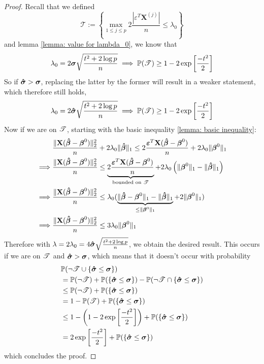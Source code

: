 \begin{proof}
    Recall that we defined
    \[
        \mathscr{T} := \left\{ \max _{1 \leq j \leq p} 2 \frac{\left| \varepsilon^{T} \mathbf{X}^{(j)}\right|}{n} \leq \lambda_{0}\right\}
    \]
    and lemma \ref{lemma: value for lambda_0}, we know that
    \[
        \lambda_{0} = 2 \boldsymbol{\sigma} \sqrt{\frac{t^{2}+2 \log p}{n}} \implies \mathbb{P}(\mathscr{T}) \geq 1-2 \exp \left[ \frac{-t^{2}}{2} \right]
    \]
    So if \(\boldsymbol{\hat{\sigma}} > \boldsymbol{\sigma}\), replacing the latter by the former will result in a weaker statement, which therefore still holds, \ie
    \[
        \lambda_{0} = 2 \boldsymbol{\hat{\sigma}} \sqrt{\frac{t^{2}+2 \log p}{n}} \implies \mathbb{P}(\mathscr{T}) \geq 1-2 \exp \left[ \frac{-t^{2}}{2} \right]
    \]
    Now if we are on \(\mathscr{T}\), starting with the basic inequality \ref{lemma: basic inequality}:
    \begin{align*}
                 & \frac{\| \mathbf{X} (\boldsymbol{\hat{\beta}}-\boldsymbol{\beta}^{0})\|_{2}^{2}}{n} + 2\lambda_0 \|\boldsymbol{\hat{\beta}}\|_{1} \leq 2 \frac{\boldsymbol{\varepsilon}^{T} \mathbf{X} (\boldsymbol{\hat{\beta}}-\boldsymbol{\beta}^{0})}{n} + 2\lambda_0 \| \boldsymbol{\beta}^{0} \|_{1}                                             \\
        \implies & \frac{\| \mathbf{X} (\boldsymbol{\hat{\beta}}-\boldsymbol{\beta}^{0})\|_{2}^{2}}{n} \leq \underbrace{2 \frac{\boldsymbol{\varepsilon}^{T} \mathbf{X} (\boldsymbol{\hat{\beta}} - \boldsymbol{\beta}^{0})}{n}}_{\text{bounded on } \mathscr{T}} + 2 \lambda_0 \left( \| \boldsymbol{\beta}^{0} \|_{1} - \|\boldsymbol{\hat{\beta}}\|_{1} \right) \\
        \implies & \frac{\| \mathbf{X} (\boldsymbol{\hat{\beta}}-\boldsymbol{\beta}^{0})\|_{2}^{2}}{n} \leq \lambda_0 ( \underbrace{\|\boldsymbol{\hat{\beta}} - \boldsymbol{\beta}^{0} \|_1 - \|\boldsymbol{\hat{\beta}}\|_{1}}_{\leq \| \boldsymbol{\beta}^{0} \|_{1}} + 2 \| \boldsymbol{\beta}^{0} \|_{1} )                             \\
        \implies & \frac{\| \mathbf{X} (\boldsymbol{\hat{\beta}}-\boldsymbol{\beta}^{0})\|_{2}^{2}}{n} \leq 3 \lambda_0 \| \boldsymbol{\beta}^{0} \|_{1}
    \end{align*}
    Therefore with \(\lambda = 2 \lambda_0 = 4 \boldsymbol{\hat{\sigma}} \sqrt{\frac{t^2 + 2 \log p}{n}}\), we obtain the desired result. This occurs if we are on \( \mathscr{T} \) and \(\boldsymbol{\hat{\sigma}} > \boldsymbol{\sigma}\), which means that it doesn't occur with probability
    \begin{align*}
         & \mathbb{P}(\neg \mathscr{T} \cup \{ \boldsymbol{\hat{\sigma}} \leq \boldsymbol{\sigma} \})                                                          \\
         & = \mathbb{P}(\neg \mathscr{T}) + \mathbb{P}(\{ \boldsymbol{\hat{\sigma}} \leq \boldsymbol{\sigma} \}) - \mathbb{P}(\neg \mathscr{T} \cap \{ \boldsymbol{\hat{\sigma}} \leq \boldsymbol{\sigma} \})            \\
         & \leq \mathbb{P}(\neg \mathscr{T}) + \mathbb{P}(\{ \boldsymbol{\hat{\sigma}} \leq \boldsymbol{\sigma} \})                                                    \\
         & = 1 - \mathbb{P}(\mathscr{T}) + \mathbb{P}(\{ \boldsymbol{\hat{\sigma}} \leq \boldsymbol{\sigma} \})                                                        \\
         & \leq 1 - \left( 1 - 2 \exp \left[ \frac{- t^{2}}{2} \right] \right) + \mathbb{P}(\{ \boldsymbol{\hat{\sigma}} \leq \boldsymbol{\sigma} \}) \\
         & = 2 \exp \left[ \frac{- t^{2}}{2} \right] + \mathbb{P}(\{ \boldsymbol{\hat{\sigma}} \leq \boldsymbol{\sigma} \})
    \end{align*}
    which concludes the proof.
\end{proof}
